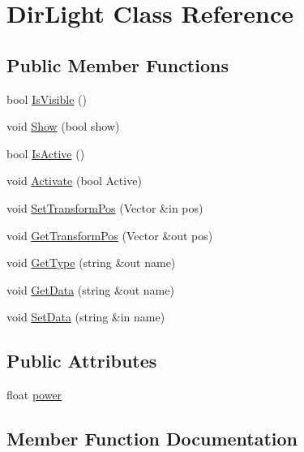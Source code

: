 \hypertarget{class_dir_light}{}\section{Dir\+Light Class Reference}
\label{class_dir_light}
\subsection*{Public Member Functions}
\begin{DoxyCompactItemize}
\item 
bool \hyperlink{class_dir_light_a1ef7dc819ad78357285605b9c2e09557}{Is\+Visible} ()
\item 
void \hyperlink{class_dir_light_a2158012fdbe3dba5f83c9d2e67cceab9}{Show} (bool show)
\item 
bool \hyperlink{class_dir_light_a3cb7c83bccdd1330b8044a1bff736142}{Is\+Active} ()
\item 
void \hyperlink{class_dir_light_a8b3bb8318f5f3298e0fe80f2a57aeae4}{Activate} (bool Active)
\item 
void \hyperlink{class_dir_light_a81f5f88a06ca2991ad71fc8f68890932}{Set\+Transform\+Pos} (Vector \&in pos)
\item 
void \hyperlink{class_dir_light_a1e334ab435f050aec344e03b076d3d81}{Get\+Transform\+Pos} (Vector \&out pos)
\item 
void \hyperlink{class_dir_light_ae226fc1e83b9697fa5688842209d50b6}{Get\+Type} (string \&out name)
\item 
void \hyperlink{class_dir_light_a4b183acc902f8f2abfa511acaa6d2013}{Get\+Data} (string \&out name)
\item 
void \hyperlink{class_dir_light_a9a81f22cc9a43752bf6101ca6a202faf}{Set\+Data} (string \&in name)
\end{DoxyCompactItemize}
\subsection*{Public Attributes}
\begin{DoxyCompactItemize}
\item 
float \hyperlink{class_dir_light_a8d4ab566796b262a9321bdb6a8ade460}{power}
\end{DoxyCompactItemize}


\subsection{Member Function Documentation}
\hypertarget{class_dir_light_a8b3bb8318f5f3298e0fe80f2a57aeae4}{}\label{class_dir_light_a8b3bb8318f5f3298e0fe80f2a57aeae4} 
